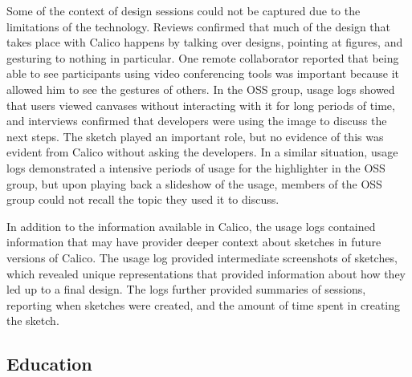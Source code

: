 
Some of the context of design sessions could not be captured due to the limitations of the technology. Reviews confirmed that much of the design that takes place with Calico happens by talking over designs, pointing at figures, and gesturing to nothing in particular. One remote collaborator reported that being able to see participants using video conferencing tools was important because it allowed him to see the gestures of others. In the OSS group, usage logs showed that users viewed canvases without interacting with it for long periods of time, and interviews confirmed that developers were using the image to discuss the next steps. The sketch played an important role, but no evidence of this was evident from Calico without asking the developers. In a similar situation, usage logs demonstrated a intensive periods of usage for the highlighter in the OSS group, but upon playing back a slideshow of the usage, members of the OSS group could not recall the topic they used it to discuss.


In addition to the information available in Calico, the usage logs contained information that may have provider deeper context about sketches in future versions of Calico. The usage log provided intermediate screenshots of sketches, which revealed unique representations that provided information about how they led up to a final design. The logs further provided summaries of sessions, reporting when sketches were created, and the amount of time spent in creating the sketch. 


\subsection{Education}

